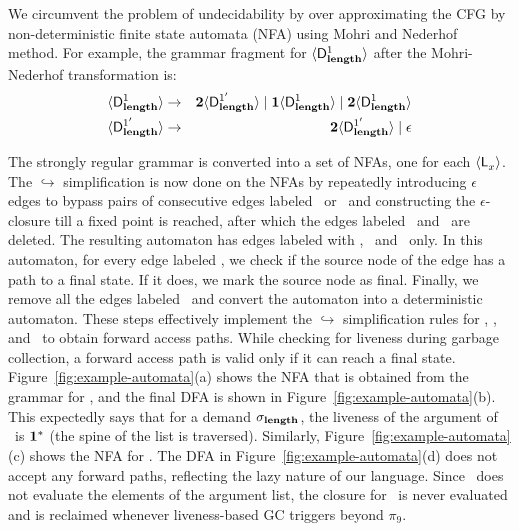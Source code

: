 We circumvent the problem of undecidability by over approximating the
CFG by non-deterministic finite state automata (NFA) using
Mohri  and Nederhof~\cite{mohri00regular} method.
For example, the grammar fragment for %
$\langle \mathsf{D}_{\mathit {\mathbf{length}}}^{1}\rangle$ after the Mohri-Nederhof transformation is:
 \begin{eqnarray*}
   \langle \mathsf{D}_{\mathit {\mathbf{length}}}^{1}\rangle &\rightarrow& {\mathbf{2}}\langle \mathsf{D}_{\mathit {\mathbf{length}}}^{1'}\rangle \mid
   \mathbf{1}\langle \mathsf{D}_{\mathit {\mathbf{length}}}^{1}\rangle
   \mid {\mathbf{2}}\langle \mathsf{D}_{\mathit {\mathbf{length}}}^{1}\rangle\\
   \langle \mathsf{D}_{\mathit {\mathbf{length}}}^{1'}\rangle &\rightarrow& {\mathbf{2}}\langle \mathsf{D}_{\mathit {\mathbf{length}}}^{1'}\rangle
   \mid \epsilon
 \end{eqnarray*}

The strongly regular grammar is converted  into a set of NFAs, one for
each $\langle \mathsf{L}_{{x}}^{}\rangle$.  The  $\hookrightarrow$ simplification is now
done on the NFAs by  repeatedly introducing $\epsilon$ edges to bypass
pairs  of consecutive  edges  labeled \bcar\acar\  or \bcdr\acdr\  and
constructing  the $\epsilon$-closure  till a  fixed point  is reached,
after which  the edges labeled  \bcar \  and \bcdr\ are  deleted.  
The
resulting  automaton   has  edges  labeled  with   \acar,  \acdr\  and
\clazy\ only.  In this  automaton, for every  edge labeled  \clazy, we
check if the source node of the edge has a path to a final 
state.  If it does, we mark  the source node as final. Finally, we
remove all the edges labeled \clazy\  and convert the automaton into a
deterministic    automaton.    These steps   effectively   implement    the
$\hookrightarrow$   simplification  rules   for   \bcar,  \bcdr,   and
\clazy\ to  obtain forward access paths.  While checking for  liveness during
garbage  collection, a  forward access path  is valid  only if  it can
reach a  final state.  Figure~\ref{fig:example-automata}(a)  shows the
NFA that is obtained from  the grammar for , and   the
final  DFA  is  shown in  Figure~\ref{fig:example-automata}(b).   This
expectedly  says that for a  demand  $\sigma_{\mathbf{length}}$,  the
liveness of  the argument of \length\  is $\mathbf{1}^{*}$  (the spine  of the  list is
traversed).  Similarly, Figure~\ref{fig:example-automata}(c) shows the
NFA     for     \var{\Lanv{\pa}{}}.      The     DFA in
Figure~\ref{fig:example-automata}(d)  does  not   accept  any  forward
paths, reflecting  the  lazy  nature  of  our  language.   Since
\length\ does not  evaluate the elements of  the argument list,
the  closure for  \pa\ is  never evaluated  and is  reclaimed whenever
liveness-based GC triggers beyond $\pi_9$.
